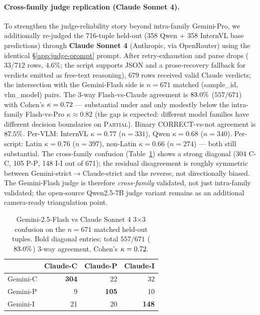 \paragraph{Cross-family judge replication (Claude Sonnet 4).}
To strengthen the judge-reliability story beyond intra-family Gemini-Pro, we additionally re-judged the 716-tuple held-out (358 Qwen + 358 InternVL base predictions) through \textbf{Claude Sonnet 4} (Anthropic, via OpenRouter) using the identical \S\ref{app:judge-prompt} prompt. After retry-exhaustion and parse drops ($33/712$ rows, $4.6\%$; the script supports JSON and a prose-recovery fallback for verdicts emitted as free-text reasoning), $679$ rows received valid Claude verdicts; the intersection with the Gemini-Flash side is $n=671$ matched (sample\_id, vlm\_model) pairs. The 3-way Flash-vs-Claude agreement is $83.0\%$ ($557/671$) with Cohen's $\kappa = 0.72$ --- substantial under \citet{landis1977kappa} and only modestly below the intra-family Flash-vs-Pro $\kappa \approx 0.82$ (the gap is expected: different model families have different decision boundaries on \textsc{Partial}). Binary CORRECT-vs-not agreement is $87.5\%$. Per-VLM: InternVL $\kappa = 0.77$ ($n=331$), Qwen $\kappa = 0.68$ ($n=340$). Per-script: Latin $\kappa = 0.76$ ($n=397$), non-Latin $\kappa = 0.66$ ($n=274$) --- both still substantial. The cross-family confusion (Table~\ref{tab:claude-confusion}) shows a strong diagonal (304 \textsc{C-C}, 105 \textsc{P-P}, 148 \textsc{I-I} out of 671); the residual disagreement is roughly symmetric between Gemini-strict$\to$Claude-strict and the reverse, not directionally biased. The Gemini-Flash judge is therefore \emph{cross-family} validated, not just intra-family validated; the open-source Qwen2.5-7B judge variant remains as an additional camera-ready triangulation point.

\begin{table}[t]
\centering
\small
\begin{tabular}{lrrr}
\toprule
& Claude-C & Claude-P & Claude-I \\
\midrule
Gemini-C & \textbf{304} & 22  & 32  \\
Gemini-P & 9   & \textbf{105} & 10  \\
Gemini-I & 21  & 20  & \textbf{148} \\
\bottomrule
\end{tabular}
\caption{Gemini-2.5-Flash vs Claude Sonnet 4 3$\times$3 confusion on the $n=671$ matched held-out tuples. Bold diagonal entries; total $557/671$ ($83.0\%$) 3-way agreement, Cohen's $\kappa = 0.72$.}
\label{tab:claude-confusion}
\end{table}

